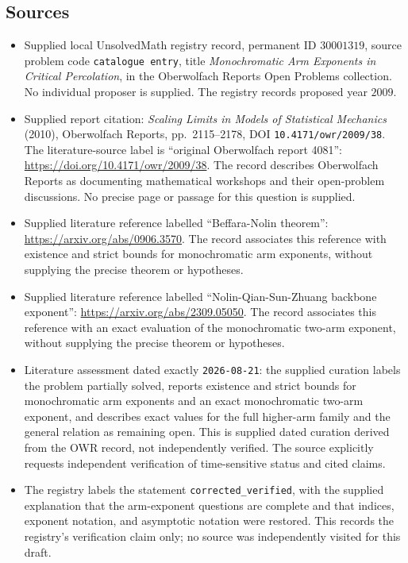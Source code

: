 \documentclass[11pt]{article}
\begin{document}
\subsection{Sources}
\begin{itemize}
\item Supplied local UnsolvedMath registry record, permanent ID \(30001319\), source problem code \texttt{catalogue entry}, title \emph{Monochromatic Arm Exponents in Critical Percolation}, in the Oberwolfach Reports Open Problems collection. No individual proposer is supplied. The registry records proposed year \(2009\).
\item Supplied report citation: \emph{Scaling Limits in Models of Statistical Mechanics} (2010), Oberwolfach Reports, pp.\ 2115--2178, DOI \texttt{10.4171/owr/2009/38}. The literature-source label is ``original Oberwolfach report 4081'': \url{https://doi.org/10.4171/owr/2009/38}. The record describes Oberwolfach Reports as documenting mathematical workshops and their open-problem discussions. No precise page or passage for this question is supplied.
\item Supplied literature reference labelled ``Beffara-Nolin theorem'': \url{https://arxiv.org/abs/0906.3570}. The record associates this reference with existence and strict bounds for monochromatic arm exponents, without supplying the precise theorem or hypotheses.
\item Supplied literature reference labelled ``Nolin-Qian-Sun-Zhuang backbone exponent'': \url{https://arxiv.org/abs/2309.05050}. The record associates this reference with an exact evaluation of the monochromatic two-arm exponent, without supplying the precise theorem or hypotheses.
\item Literature assessment dated exactly \texttt{2026-08-21}: the supplied curation labels the problem partially solved, reports existence and strict bounds for monochromatic arm exponents and an exact monochromatic two-arm exponent, and describes exact values for the full higher-arm family and the general relation as remaining open. This is supplied dated curation derived from the OWR record, not independently verified. The source explicitly requests independent verification of time-sensitive status and cited claims.
\item The registry labels the statement \texttt{corrected\_verified}, with the supplied explanation that the arm-exponent questions are complete and that indices, exponent notation, and asymptotic notation were restored. This records the registry's verification claim only; no source was independently visited for this draft.
\end{itemize}
\end{document}
